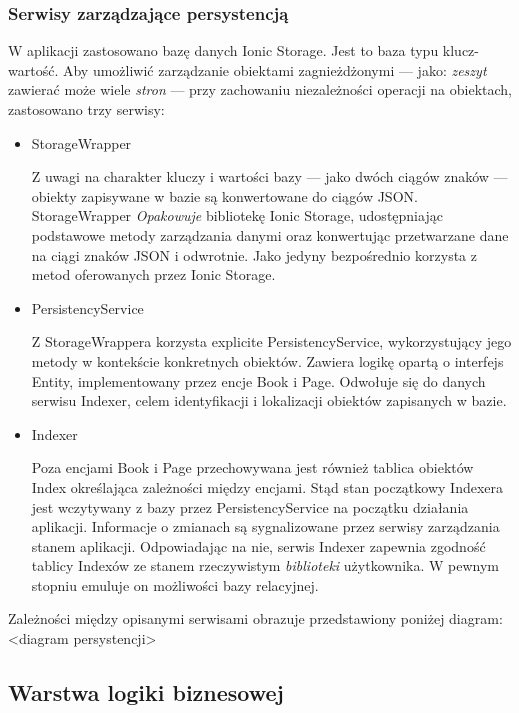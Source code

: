 \subsubsection{Serwisy zarządzające persystencją}
W aplikacji zastosowano bazę danych Ionic Storage. Jest to baza typu klucz-wartość. Aby umożliwić
zarządzanie obiektami zagnieżdżonymi — jako: \textit{zeszyt} zawierać może wiele \textit{stron} — przy zachowaniu
niezależności operacji na obiektach, zastosowano trzy serwisy:
\begin{itemize}
	\item StorageWrapper

	      Z uwagi na charakter kluczy i wartości bazy — jako dwóch ciągów znaków — obiekty zapisywane w bazie są
	      konwertowane do ciągów JSON. StorageWrapper \textit{Opakowuje} bibliotekę Ionic Storage, udostępniając podstawowe
	      metody zarządzania danymi oraz konwertując przetwarzane dane na ciągi znaków JSON i odwrotnie.
	      Jako jedyny bezpośrednio korzysta z metod oferowanych przez Ionic Storage.
	\item PersistencyService

	      Z StorageWrappera korzysta explicite PersistencyService, wykorzystujący jego metody w kontekście konkretnych obiektów.
	      Zawiera logikę opartą o interfejs Entity, implementowany przez encje Book i Page. Odwołuje się do danych
	      serwisu Indexer, celem identyfikacji i lokalizacji obiektów zapisanych w bazie.
	\item Indexer

	      Poza encjami Book i Page przechowywana jest również tablica obiektów Index określająca
	      zależności między encjami. Stąd stan początkowy Indexera jest wczytywany z bazy przez PersistencyService
	      na początku działania aplikacji.
	      Informacje o zmianach są sygnalizowane przez serwisy zarządzania stanem aplikacji.
	      Odpowiadając na nie, serwis Indexer zapewnia zgodność tablicy Indexów ze stanem rzeczywistym
	      \textit{biblioteki} użytkownika. W pewnym stopniu emuluje on możliwości bazy relacyjnej.
\end{itemize}
Zależności między opisanymi serwisami obrazuje przedstawiony poniżej diagram:
<diagram persystencji>
\subsection{Warstwa logiki biznesowej}
